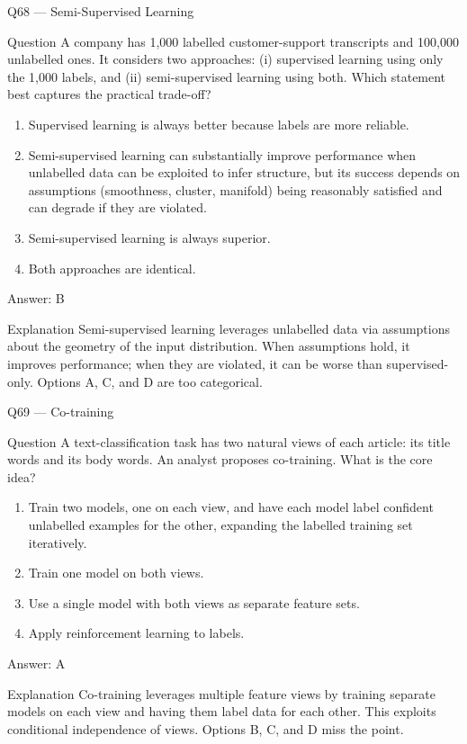 \documentclass[aspectratio=169,8pt]{beamer}
\begin{document}
	\begin{frame}{Q68 --- Semi-Supervised Learning}
		\begin{block}{Question}
			A company has 1,000 labelled customer-support transcripts and 100,000 unlabelled ones. It considers two approaches: (i) supervised learning using only the 1,000 labels, and (ii) semi-supervised learning using both. Which statement best captures the practical trade-off?
		\end{block}
		\begin{enumerate}
			\item Supervised learning is always better because labels are more reliable.
			\item Semi-supervised learning can substantially improve performance when unlabelled data can be exploited to infer structure, but its success depends on assumptions (smoothness, cluster, manifold) being reasonably satisfied and can degrade if they are violated.
			\item Semi-supervised learning is always superior.
			\item Both approaches are identical.
		\end{enumerate}
		\begin{exampleblock}{Answer: B}\end{exampleblock}
		\begin{block}{Explanation}
			Semi-supervised learning leverages unlabelled data via assumptions about the geometry of the input distribution. When assumptions hold, it improves performance; when they are violated, it can be worse than supervised-only. Options A, C, and D are too categorical.
		\end{block}
	\end{frame}
	
	\begin{frame}{Q69 --- Co-training}
		\begin{block}{Question}
			A text-classification task has two natural views of each article: its title words and its body words. An analyst proposes co-training. What is the core idea?
		\end{block}
		\begin{enumerate}
			\item Train two models, one on each view, and have each model label confident unlabelled examples for the other, expanding the labelled training set iteratively.
			\item Train one model on both views.
			\item Use a single model with both views as separate feature sets.
			\item Apply reinforcement learning to labels.
		\end{enumerate}
		\begin{exampleblock}{Answer: A}\end{exampleblock}
		\begin{block}{Explanation}
			Co-training leverages multiple feature views by training separate models on each view and having them label data for each other. This exploits conditional independence of views. Options B, C, and D miss the point.
		\end{block}
	\end{frame}
	
\end{document}
